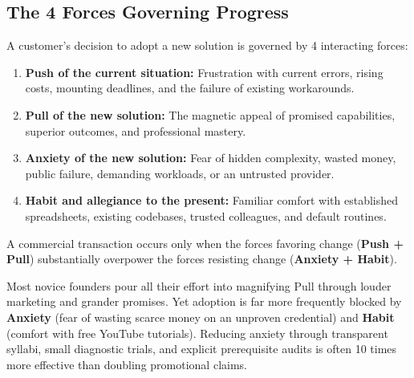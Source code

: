 \subsection{The 4 Forces Governing Progress}

A customer's decision to adopt a new solution is governed by 4 interacting forces:
\begin{enumerate}[leftmargin=1.2em,itemsep=0.2ex]
  \item \textbf{Push of the current situation:} Frustration with current errors, rising costs, mounting deadlines, and the failure of existing workarounds.
  \item \textbf{Pull of the new solution:} The magnetic appeal of promised capabilities, superior outcomes, and professional mastery.
  \item \textbf{Anxiety of the new solution:} Fear of hidden complexity, wasted money, public failure, demanding workloads, or an untrusted provider.
  \item \textbf{Habit and allegiance to the present:} Familiar comfort with established spreadsheets, existing codebases, trusted colleagues, and default routines.
\end{enumerate}

A commercial transaction occurs only when the forces favoring change (\textbf{Push + Pull}) substantially overpower the forces resisting change (\textbf{Anxiety + Habit}).

Most novice founders pour all their effort into magnifying Pull through louder marketing and grander promises. Yet adoption is far more frequently blocked by \textbf{Anxiety} (fear of wasting scarce money on an unproven credential) and \textbf{Habit} (comfort with free YouTube tutorials). Reducing anxiety through transparent syllabi, small diagnostic trials, and explicit prerequisite audits is often 10 times more effective than doubling promotional claims.
